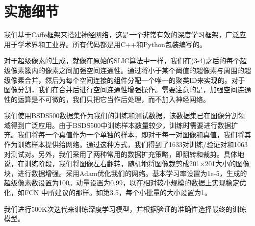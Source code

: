 \section{实施细节}

我们基于Caffe框架来搭建神经网络，这是一个非常有效的深度学习框架，广泛应用于学术界和工业界。所有代码都是用C++和Python包装编写的。

对于超级像素的生成，就像在原始的SLIC算法中一样，我们在(3-4)之后的每个超级像素簇内的像素之间加强空间连通性。通过将小于某个阈值的超像素与周围的超级像素合并，然后为每个空间连接的组件分配一个唯一的聚类ID来实现的。对于图像分割，我们在合并后进行空间连通性增强操作。需要注意的是，加强空间连通性的运算是不可微的，我们只把它当作后处理，而不加入神经网络。

我们使用BSDS500数据集作为我们的训练和测试数据，该数据集已在图像分割领域得到广泛应用。由于BSDS500中训练样本数量较少，训练时需要进行数据扩充。我们将每一个真值作为一个单独的样本，即对于每一对图像和真值，我们将其作为训练样本提供给网络。通过这种方式，我们得到了1633对训练/验证对和1063对测试对。另外，我们采用了两种常用的数据扩充策略，即翻转和裁剪。具体地说，在训练阶段，我们将图像左右翻转，随机地将图像裁剪成201$\times $201大小的图像块，进行数据增强。采用Adam优化我们的网络。基本学习率设置为1e-5，生成的超级像素数设置为100。动量设置为0.99，以在相对较小规模的数据上实现稳定优化，如FCN 中所建议的那样。如第3.5，每个小批量的大小设置为1。

我们进行500K次迭代来训练深度学习模型，并根据验证的准确性选择最终的训练模型。

